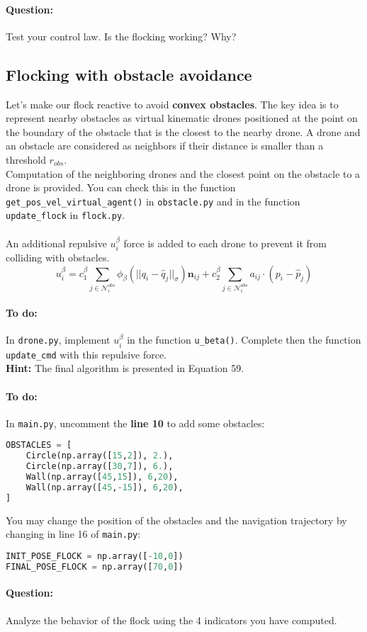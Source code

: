 \documentclass{article}
\begin{document}
\paragraph{Question:} Test your control law. Is the flocking working? Why?

\subsection{Flocking with obstacle avoidance}
Let's make our flock reactive to avoid \textbf{convex obstacles}. The key idea is to represent nearby obstacles as virtual kinematic drones positioned at the point on the boundary of the obstacle that is the closest to the nearby drone. A drone and an obstacle are considered as neighbors if their distance is smaller than a threshold $r_{obs}$.\\
Computation of the neighboring drones and the closest point on the obstacle to a drone is provided. You can check this in the function \texttt{get\_pos\_vel\_virtual\_agent()} in \texttt{obstacle.py} and in the function \texttt{update\_flock} in \texttt{flock.py}.\\ \\
An additional repulsive $u_i^{\beta}$ force is added to each drone to prevent it from colliding with obstacles.
$$
u_i^{\beta} = c_1^{\beta} \sum_{j\in \mathcal{N}_i^{obs}}\phi_\beta(||q_i - \widehat{q}_j||_\sigma)\mathbf{n}_{ij} + c_2^{\beta} \sum_{j\in \mathcal{N}_i^{obs}}a_{ij} \cdot (p_i-\widehat{p}_j)
$$

\paragraph{To do:}
In \texttt{drone.py}, implement $u_i^\beta$ in the function \texttt{u\_beta()}. Complete then the function \texttt{update\_cmd} with this repulsive force.\\
\textbf{Hint:} The final algorithm is presented in Equation 59.

\paragraph{To do:}
In \texttt{main.py}, uncomment the \textbf{line 10} to add some obstacles:
\begin{lstlisting}[language=python, frame=single]
OBSTACLES = [
    Circle(np.array([15,2]), 2.),
    Circle(np.array([30,7]), 6.),
    Wall(np.array([45,15]), 6,20),
    Wall(np.array([45,-15]), 6,20),
]
\end{lstlisting}
You may change the position of the obstacles and the navigation trajectory by changing in line 16 of \texttt{main.py}:
\begin{lstlisting}[language=python, frame=single]
INIT_POSE_FLOCK = np.array([-10,0])
FINAL_POSE_FLOCK = np.array([70,0])
\end{lstlisting}

\paragraph{Question:} Analyze the behavior of the flock using the 4 indicators you have computed.
\end{document}
